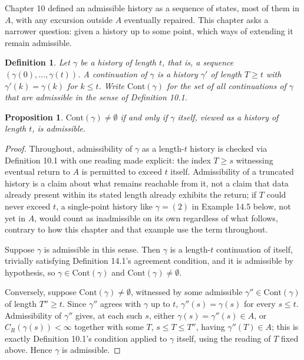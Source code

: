 \documentclass[11pt]{book}
\newtheorem{definition}[theorem]{Definition}
\newtheorem{proposition}[theorem]{Proposition}
\begin{document}
Chapter 10 defined an admissible history as a sequence of states, most of them in $A$, with any excursion outside $A$ eventually repaired. This chapter asks a narrower question: given a history up to some point, which ways of extending it remain admissible.

\begin{definition}
Let $\gamma$ be a history of length $t$, that is, a sequence $(\gamma(0), \dots, \gamma(t))$. A \emph{continuation} of $\gamma$ is a history $\gamma'$ of length $T \geq t$ with $\gamma'(k) = \gamma(k)$ for $k \leq t$. Write $\mathrm{Cont}(\gamma)$ for the set of all continuations of $\gamma$ that are admissible in the sense of Definition 10.1.
\end{definition}

\begin{proposition}
$\mathrm{Cont}(\gamma) \neq \emptyset$ if and only if $\gamma$ itself, viewed as a history of length $t$, is admissible.
\end{proposition}

\begin{proof}
Throughout, admissibility of $\gamma$ as a length-$t$ history is checked via Definition 10.1 with one reading made explicit: the index $T \geq s$ witnessing eventual return to $A$ is permitted to exceed $t$ itself. Admissibility of a truncated history is a claim about what remains reachable from it, not a claim that data already present within its stated length already exhibits the return; if $T$ could never exceed $t$, a single-point history like $\gamma = (2)$ in Example 14.5 below, not yet in $A$, would count as inadmissible on its own regardless of what follows, contrary to how this chapter and that example use the term throughout.

Suppose $\gamma$ is admissible in this sense. Then $\gamma$ is a length-$t$ continuation of itself, trivially satisfying Definition 14.1's agreement condition, and it is admissible by hypothesis, so $\gamma \in \mathrm{Cont}(\gamma)$ and $\mathrm{Cont}(\gamma) \neq \emptyset$.

Conversely, suppose $\mathrm{Cont}(\gamma) \neq \emptyset$, witnessed by some admissible $\gamma'' \in \mathrm{Cont}(\gamma)$ of length $T'' \geq t$. Since $\gamma''$ agrees with $\gamma$ up to $t$, $\gamma''(s) = \gamma(s)$ for every $s \leq t$. Admissibility of $\gamma''$ gives, at each such $s$, either $\gamma(s) = \gamma''(s) \in A$, or $C_R(\gamma(s)) < \infty$ together with some $T$, $s \leq T \leq T''$, having $\gamma''(T) \in A$; this is exactly Definition 10.1's condition applied to $\gamma$ itself, using the reading of $T$ fixed above. Hence $\gamma$ is admissible.
\end{proof}
\end{document}
